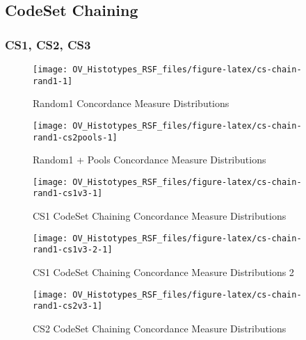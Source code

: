 \documentclass[
]{report}
\begin{document}
\hypertarget{codeset-chaining}{%
\subsection{CodeSet Chaining}\label{codeset-chaining}}

\hypertarget{cs1-cs2-cs3}{%
\subsubsection{CS1, CS2, CS3}\label{cs1-cs2-cs3}}

\begin{figure}[H]

{\centering \texttt{[image: OV\_Histotypes\_RSF\_files/figure-latex/cs-chain-rand1-1]} 

}

\caption{Random1 Concordance Measure Distributions}\label{fig:cs-chain-rand1}
\end{figure}

\begin{figure}[H]

{\centering \texttt{[image: OV\_Histotypes\_RSF\_files/figure-latex/cs-chain-rand1-cs2pools-1]} 

}

\caption{Random1 + Pools Concordance Measure Distributions}\label{fig:cs-chain-rand1-cs2pools}
\end{figure}

\begin{figure}[H]

{\centering \texttt{[image: OV\_Histotypes\_RSF\_files/figure-latex/cs-chain-rand1-cs1v3-1]} 

}

\caption{CS1 CodeSet Chaining Concordance Measure Distributions}\label{fig:cs-chain-rand1-cs1v3}
\end{figure}

\begin{figure}[H]

{\centering \texttt{[image: OV\_Histotypes\_RSF\_files/figure-latex/cs-chain-rand1-cs1v3-2-1]} 

}

\caption{CS1 CodeSet Chaining Concordance Measure Distributions 2}\label{fig:cs-chain-rand1-cs1v3-2}
\end{figure}

\begin{figure}[H]

{\centering \texttt{[image: OV\_Histotypes\_RSF\_files/figure-latex/cs-chain-rand1-cs2v3-1]} 

}

\caption{CS2 CodeSet Chaining Concordance Measure Distributions}\label{fig:cs-chain-rand1-cs2v3}
\end{figure}
\end{document}
